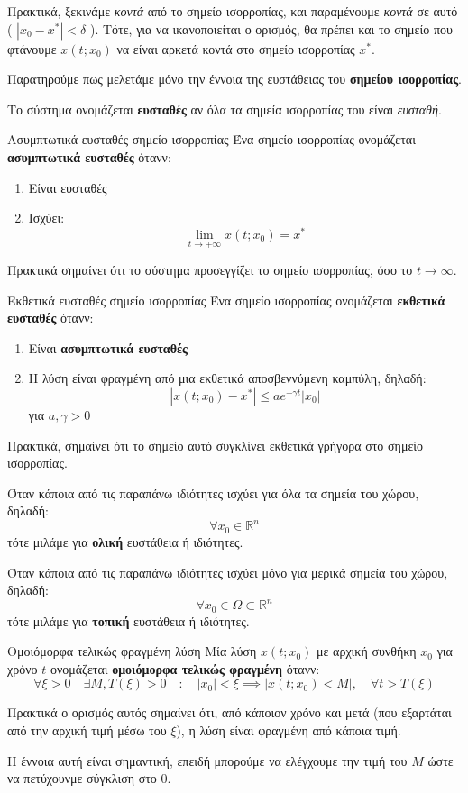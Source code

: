 \documentclass[11pt,a4paper,notitlepage,fleqn,final]{article}
\begin{document}
Πρακτικά, ξεκινάμε \textit{κοντά} από το σημείο ισορροπίας, και παραμένουμε \textit{κοντά}
σε αυτό ( \( \left|x_0-x^*\right| < \delta \) ). Τότε, για να ικανοποιείται ο ορισμός, θα
πρέπει και το σημείο που φτάνουμε \( x(t; x_0) \) να είναι αρκετά κοντά στο σημείο ισορροπίας
\( x^* \).

Παρατηρούμε πως μελετάμε μόνο την έννοια της ευστάθειας του \textbf{σημείου ισορροπίας}.

Το σύστημα ονομάζεται \textbf{ευσταθές} αν όλα τα σημεία ισορροπίας του είναι \textit{ευσταθή}.

\begin{defn}{Ασυμπτωτικά ευσταθές σημείο ισορροπίας}{}
	Ένα σημείο ισορροπίας ονομάζεται \textbf{ασυμπτωτικά ευσταθές} ότανν:
	\begin{enumerate}
		\item Είναι ευσταθές
		\item Ισχύει:
		\[
		\lim_{t \to +\infty}x(t;x_0) = x^*
		\]
	\end{enumerate}
\end{defn}
Πρακτικά σημαίνει ότι το σύστημα προσεγγίζει το σημείο ισορροπίας, όσο το \( t\to \infty \).

\begin{defn}{Εκθετικά ευσταθές σημείο ισορροπίας}{}
	Ένα σημείο ισορροπίας ονομάζεται \textbf{εκθετικά ευσταθές} ότανν:
	\begin{enumerate}
		\item Είναι \textbf{ασυμπτωτικά ευσταθές}
		\item Η λύση είναι φραγμένη από μια εκθετικά αποσβεννύμενη καμπύλη, δηλαδή:
		\[
		\left|
		x(t;x_0) - x^*
		\right| \leq ae^{-\gamma t} \left|x_0\right|
		\] για \( a,\gamma >0 \)
	\end{enumerate}
\end{defn}
Πρακτικά, σημαίνει ότι το σημείο αυτό συγκλίνει εκθετικά γρήγορα στο σημείο ισορροπίας.

Όταν κάποια από τις παραπάνω ιδιότητες ισχύει για όλα τα σημεία του χώρου, δηλαδή:
\[
\forall x_0 \in \mathbb R^n
\]
τότε μιλάμε για \textbf{ολική} ευστάθεια ή ιδιότητες.

Όταν κάποια από τις παραπάνω ιδιότητες ισχύει μόνο για μερικά σημεία του χώρου, δηλαδή:
\[
\forall x_0 \in \Omega \subset \mathbb R^n
\]
τότε μιλάμε για \textbf{τοπική} ευστάθεια ή ιδιότητες.

\begin{defn}{Ομοιόμορφα τελικώς φραγμένη λύση}{}
	Μία λύση \( x(t;x_0) \) με αρχική συνθήκη \( x_0 \) για χρόνο \( t \) ονομάζεται
	\textbf{ομοιόμορφα τελικώς φραγμένη} ότανν:
	\[
	\forall \xi > 0 \quad
	\exists M,T(\xi) > 0
	\quad : \quad
	\left|x_0\right| < \xi \implies \left|
	x(t;x_0) < M
	\right|, \quad \forall t > T(\xi)
	\]
\end{defn}
Πρακτικά ο ορισμός αυτός σημαίνει ότι, από κάποιον χρόνο και μετά (που
εξαρτάται από την αρχική τιμή μέσω του \( \xi \)), η λύση είναι φραγμένη
από κάποια τιμή.

Η έννοια αυτή είναι σημαντική, επειδή μπορούμε να ελέγχουμε την τιμή του \( M \) ώστε να
πετύχουνμε σύγκλιση στο 0.
\end{document}
